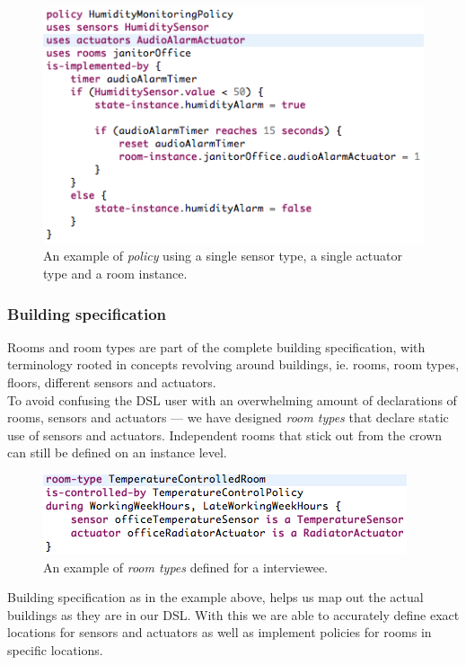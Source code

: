 \begin{figure}[h]
  \centering
    \includegraphics[scale=.5]{dsl-policy-definition.png} 
	\caption{An example of \textit{policy} using a single sensor type, a single actuator type and a room instance.}
	\label{fig:dsl-policy-definition}
\end{figure}

\newpage
\subsubsection{Building specification}\label{subsec:buildingspecification}
Rooms and room types are part of the complete building specification, with terminology rooted in concepts revolving around buildings, ie. rooms, room types, floors, different sensors and actuators. \\

To avoid confusing the DSL user with an overwhelming amount of declarations of rooms, sensors and actuators --- we have designed \textit{room types} that declare static use of sensors and actuators. Independent rooms that stick out from the crown can still be defined on an instance level.

\begin{figure}
  \centering
    \includegraphics[scale=.5]{dsl-room-types.png}
	\caption{An example of \textit{room types} defined for a interviewee.}
	\label{fig:room-types}
\end{figure}

Building specification as in the example above, helps us map out the actual buildings as they are in our DSL. With this we are able to accurately define exact locations for sensors and actuators as well as implement policies for rooms in specific locations. 

